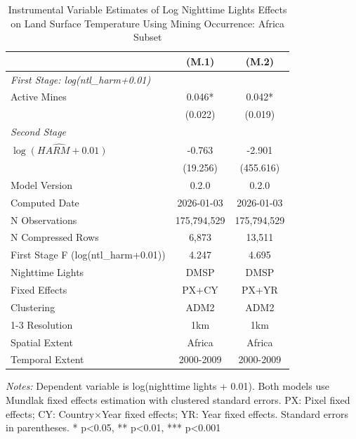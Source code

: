 \begin{table}[htbp]
\centering
\footnotesize
\caption{Instrumental Variable Estimates of Log Nighttime Lights Effects on Land Surface Temperature Using Mining Occurrence: Africa Subset}
\begin{tabular}{lcc}
\toprule
 & (M.1) & (M.2) \\
\midrule
\midrule
\multicolumn{3}{l}{\textit{First Stage: log(ntl\_harm+0.01)}} \\
  Active Mines & 0.046* & 0.042* \\
 & (0.022) & (0.019) \\
\midrule
\multicolumn{3}{l}{\textit{Second Stage}} \\
$\hat{\log(HARM + 0.01)}$ & -0.763 & -2.901 \\
 & (19.256) & (455.616) \\
\midrule
Model Version & 0.2.0 & 0.2.0 \\
Computed Date & 2026-01-03 & 2026-01-03 \\
N Observations & 175,794,529 & 175,794,529 \\
N Compressed Rows & 6,873 & 13,511 \\
First Stage F (log(ntl\_harm+0.01)) & 4.247 & 4.695 \\
\midrule
Nighttime Lights & DMSP & DMSP \\
Fixed Effects & PX+CY & PX+YR \\
Clustering & ADM2 & ADM2 \\
\cmidrule(lr){1-3}
Resolution & 1km & 1km \\
Spatial Extent & Africa & Africa \\
Temporal Extent & 2000-2009 & 2000-2009 \\
\bottomrule
\end{tabular}
\begin{threeparttable}
\begin{tablenotes}\small
\item \textit{Notes:} Dependent variable is log(nighttime lights + 0.01). Both models use Mundlak fixed effects estimation with clustered standard errors. PX: Pixel fixed effects; CY: Country×Year fixed effects; YR: Year fixed effects. Standard errors in parentheses. * p<0.05, ** p<0.01, *** p<0.001
\end{tablenotes}
\end{threeparttable}
\end{table}